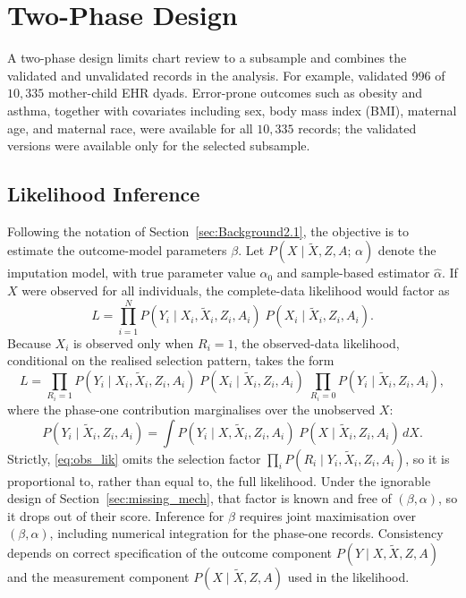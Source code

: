 \section{Two-Phase Design}
\label{sec:two_phase}

A two-phase design limits chart review to a subsample and combines the validated and unvalidated records in the analysis. For example, \citet{shepherd2023multiwave} validated 996 of $10{,}335$ mother-child EHR dyads. Error-prone outcomes such as obesity and asthma, together with covariates including sex, body mass index (BMI), maternal age, and maternal race, were available for all $10{,}335$ records; the validated versions were available only for the selected subsample.

\subsection{Likelihood Inference}
\label{sec:likelihood}

Following the notation of Section~\ref{sec:Background2.1}, the objective is to estimate the outcome-model parameters $\beta$. Let $P(X \mid \tilde{X}, Z, A;\, \alpha)$ denote the imputation model, with true parameter value $\alpha_0$ and sample-based estimator $\hat{\alpha}$. If $X$ were observed for all individuals, the complete-data likelihood would factor as
\begin{equation}
    L = \prod_{i=1}^{N}
    P(Y_i \mid X_i, \tilde{X}_i, Z_i, A_i)\;
    P(X_i \mid \tilde{X}_i, Z_i, A_i).
    \label{eq:complete_lik}
\end{equation}
Because $X_i$ is observed only when $R_i = 1$, the observed-data likelihood, conditional on the realised selection pattern, takes the form
\begin{equation}
    L = \prod_{R_i=1}
    P(Y_i \mid X_i, \tilde{X}_i, Z_i, A_i)\;
    P(X_i \mid \tilde{X}_i, Z_i, A_i)
    \;\prod_{R_i=0}
    P(Y_i \mid \tilde{X}_i, Z_i, A_i),
    \label{eq:obs_lik}
\end{equation}
where the phase-one contribution marginalises over the unobserved $X$:
\begin{equation}
    P(Y_i \mid \tilde{X}_i, Z_i, A_i)
    = \int P(Y_i \mid X, \tilde{X}_i, Z_i, A_i)\;
    P(X \mid \tilde{X}_i, Z_i, A_i)\, dX.
    \label{eq:marginal_Y}
\end{equation}
Strictly, \eqref{eq:obs_lik} omits the selection factor $\prod_i P(R_i \mid Y_i, \tilde{X}_i, Z_i, A_i)$, so it is proportional to, rather than equal to, the full likelihood. Under the ignorable design of Section~\ref{sec:missing_mech}, that factor is known and free of $(\beta, \alpha)$, so it drops out of their score. Inference for $\beta$ requires joint maximisation over $(\beta, \alpha)$, including numerical integration for the phase-one records. Consistency depends on correct specification of the outcome component $P(Y \mid X, \tilde{X}, Z, A)$ and the measurement component $P(X \mid \tilde{X}, Z, A)$ used in the likelihood.

